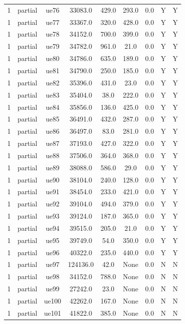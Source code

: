 \begin{table}[ht]
\begin{tabular}{|c|c|c|c|c|c|c|c|c|}
1 & partial & ue76 & 33083.0 & 429.0 & 293.0 & 0.0 & Y & Y \\
1 & partial & ue77 & 33367.0 & 320.0 & 428.0 & 0.0 & Y & Y \\
1 & partial & ue78 & 34152.0 & 700.0 & 399.0 & 0.0 & Y & Y \\
1 & partial & ue79 & 34782.0 & 961.0 & 21.0 & 0.0 & Y & Y \\
1 & partial & ue80 & 34786.0 & 635.0 & 189.0 & 0.0 & Y & Y \\
1 & partial & ue81 & 34790.0 & 250.0 & 185.0 & 0.0 & Y & Y \\
1 & partial & ue82 & 35396.0 & 431.0 & 23.0 & 0.0 & Y & Y \\
1 & partial & ue83 & 35404.0 & 38.0 & 222.0 & 0.0 & Y & Y \\
1 & partial & ue84 & 35856.0 & 136.0 & 425.0 & 0.0 & Y & Y \\
1 & partial & ue85 & 36491.0 & 432.0 & 287.0 & 0.0 & Y & Y \\
1 & partial & ue86 & 36497.0 & 83.0 & 281.0 & 0.0 & Y & Y \\
1 & partial & ue87 & 37193.0 & 427.0 & 322.0 & 0.0 & Y & Y \\
1 & partial & ue88 & 37506.0 & 364.0 & 368.0 & 0.0 & Y & Y \\
1 & partial & ue89 & 38088.0 & 586.0 & 29.0 & 0.0 & Y & Y \\
1 & partial & ue90 & 38104.0 & 240.0 & 128.0 & 0.0 & Y & Y \\
1 & partial & ue91 & 38454.0 & 233.0 & 421.0 & 0.0 & Y & Y \\
1 & partial & ue92 & 39104.0 & 494.0 & 379.0 & 0.0 & Y & Y \\
1 & partial & ue93 & 39124.0 & 187.0 & 365.0 & 0.0 & Y & Y \\
1 & partial & ue94 & 39515.0 & 205.0 & 21.0 & 0.0 & Y & Y \\
1 & partial & ue95 & 39749.0 & 54.0 & 350.0 & 0.0 & Y & Y \\
1 & partial & ue96 & 40322.0 & 235.0 & 440.0 & 0.0 & Y & Y \\
1 & partial & ue97 & 124136.0 & 42.0 & None & 0.0 & N & N \\
1 & partial & ue98 & 34152.0 & 788.0 & None & 0.0 & N & N \\
1 & partial & ue99 & 27242.0 & 23.0 & None & 0.0 & N & N \\
1 & partial & ue100 & 42262.0 & 167.0 & None & 0.0 & N & N \\
1 & partial & ue101 & 41822.0 & 385.0 & None & 0.0 & N & N \\

\end{tabular}
\end{table}
